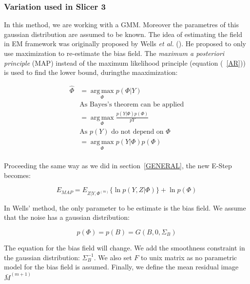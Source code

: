 \subsubsection{Variation used in Slicer 3}
In this method, we are working with a GMM. Moreover the parametres of this gaussian distribution are assumed to be known. The idea of estimating the field in EM framework was originally proposed by Wells \textit{et al.} (\cite{10}). He proposed to only use maximization to re-estimate the bias field. The \textit{maximum a posteriori principle} (MAP) instead of the maximum likelihood principle (equation (~\ref{AR})) is used to find the lower bound, duringthe maaximization:

\begin{align*}\label{ARMAP}
  \hat{\Phi} &=\operatorname*{arg\,max}_\Phi p(\Phi |Y)\\
             &\mbox{As Bayes's theorem can be applied} \\
             &=\operatorname*{arg\,max}_\Phi \frac{p(Y|\Phi)p(\Phi)}{p{Y}}\\  
             &\mbox{As $p(Y)$ do not depend on $\Phi$} \\
             &=\operatorname*{arg\,max}_\Phi p(Y|\Phi)p(\Phi)\\
  \end{align*}

Proceeding the same way as we did in section~\ref{GENERAL}, the new E-Step becomes:

\begin{equation}\label{EMAP}
E_{MAP} = E_{Z|Y,\Phi^{(m)}}\{ \operatorname*{ln} p(Y,Z|\Phi) \} + \operatorname*{ln} p(\Phi)
\end{equation}

In Wells' method, the only parameter to be estimate is the bias field. We assume that the noise has a gaussian distribution:

  \begin{equation*}
  p(\Phi) = p(B) = G(B,0,\Sigma_B)
  \end{equation*}
  
The equation for the bias field will change. We add the smoothness constraint in the gaussian distribution: $\Sigma_B^{-1}$. We also set $F$ to unix matrix as no parametric model for the bias field is assumed. Finally, we define the mean residual image $\bar{M}^{(m+1)}$

